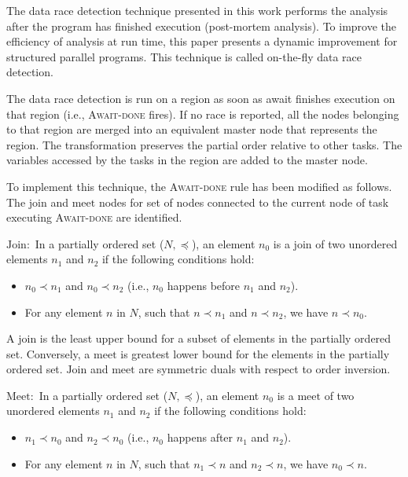 The data race detection technique presented in this work performs the analysis after the program has finished execution (post-mortem analysis). To improve the efficiency of analysis at run time, this paper presents a dynamic improvement for structured parallel programs. This technique is called on-the-fly data race detection. 

The data race detection is run on a region as soon as await finishes execution on that region (i.e., \textsc{Await-done} fires). If no race is reported, all the nodes belonging to that region are merged into an equivalent master node that represents the region. The transformation preserves the partial order relative to other tasks. The variables accessed by the tasks in the region are added to the master node. 

To implement this technique, the \textsc{Await-done} rule has been modified as follows. The $\mathrm{join}$ and $\mathrm{meet}$ nodes for set of nodes connected to the current node of task executing \textsc{Await-done} are identified.

\begin{definition}
$\mathrm{Join}:$ In a partially ordered set ($N, \preceq$), an element $n_0$ is a $\mathrm{join}$ of two unordered elements $n_1$ and $n_2$ if the following conditions hold:
\begin{itemize}
\item $n_0 \prec n_1$ and $n_0 \prec n_2$ (i.e., $n_0$ happens before $n_1$ and $n_2$).
\item For any element $n$ in $N$, such that $n \prec n_1$ and $n \prec n_2$, we have $n \prec n_0$.
\end{itemize}
\end{definition}

A $\mathrm{join}$ is the least upper bound for a subset of elements in the partially ordered set. Conversely, a $\mathrm{meet}$ is greatest lower bound for the elements in the partially ordered set. $\mathrm{Join}$ and $\mathrm{meet}$ are symmetric duals with respect to order inversion. 

\begin{definition}
$\mathrm{Meet}:$ In a partially ordered set ($N, \preceq$), an element $n_0$ is a $\mathrm{meet}$ of two unordered elements $n_1$ and $n_2$ if the following conditions hold:
\begin{itemize}
\item $n_1 \prec n_0$ and $n_2 \prec n_0$ (i.e., $n_0$ happens after $n_1$ and $n_2$).
\item For any element $n$ in $N$, such that $n_1 \prec n$ and $n_2 \prec n$, we have $n_0 \prec n$.
\end{itemize}
\end{definition}

